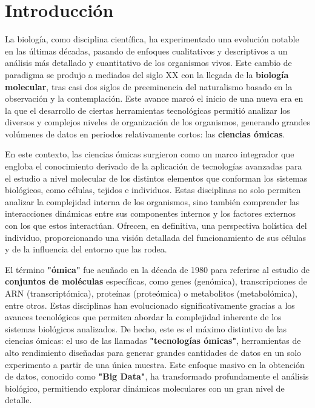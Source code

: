\section{Introducción}

La biología, como disciplina científica, ha experimentado una evolución notable en las últimas décadas, 
pasando de enfoques cualitativos y descriptivos a un análisis más detallado y cuantitativo de los organismos 
vivos. Este cambio de paradigma se produjo a mediados del siglo XX con la llegada de la \textbf{biología molecular},
tras casi dos siglos de preeminencia del naturalismo basado en la observación y la contemplación. 
Este avance marcó el inicio de una nueva era en la que el desarrollo de ciertas herramientas tecnológicas permitió 
analizar los diversos y complejos niveles de organización de los organismos, generando grandes volúmenes de datos 
en periodos relativamente cortos: las \textbf{ciencias ómicas}. \newline%

En este contexto, las ciencias ómicas surgieron como un marco integrador que engloba el conocimiento derivado 
de la aplicación de tecnologías avanzadas para el estudio a nivel molecular de los distintos elementos que 
conforman los sistemas biológicos, como células, tejidos e individuos. Estas disciplinas no solo permiten 
analizar la complejidad interna de los organismos, sino también comprender las interacciones dinámicas 
entre sus componentes internos y los factores externos con los que estos interactúan. Ofrecen, en definitiva,
una perspectiva holística del individuo, proporcionando una visión detallada del funcionamiento de sus células 
y de la influencia del entorno que las rodea. \newline%

El término \textbf{"ómica"} fue acuñado en la década de 1980 para referirse al estudio de 
\textbf{conjuntos de moléculas} específicas, como genes (genómica), transcripciones de ARN (transcriptómica), 
proteínas (proteómica) o metabolitos (metabolómica), entre otros. Estas disciplinas han evolucionado 
significativamente gracias a los avances tecnológicos que permiten abordar la complejidad inherente de los 
sistemas biológicos analizados. De hecho, este es el máximo distintivo de las ciencias ómicas: el uso de las 
llamadas \textbf{"tecnologías ómicas"}, herramientas de alto rendimiento diseñadas para generar grandes cantidades 
de datos en un solo experimento a partir de una única muestra. Este enfoque masivo en la obtención de datos, 
conocido como \textbf{"Big Data"}, ha transformado profundamente el análisis biológico, permitiendo explorar 
dinámicas moleculares con un gran nivel de detalle.\newline%

